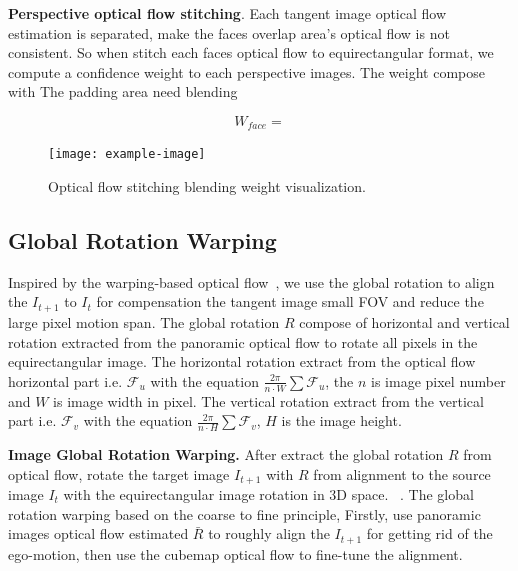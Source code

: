 \textbf{Perspective optical flow stitching}.
Each tangent image optical flow estimation is separated, make the faces overlap area's optical flow is not consistent.
So when stitch each faces optical flow to equirectangular format, we compute a confidence weight to each perspective images.
The weight compose with 
The padding area need blending

\begin{equation}
W_{face} =
\end{equation}

\begin{figure}[hbt!]
	\centering
	\texttt{[image: example-image]}
	\caption{Optical flow stitching blending weight visualization.}
	\label{fig:approach:blendweight}
\end{figure}

\subsection{Global Rotation Warping}
\label{sec:approach:warping}

Inspired by the warping-based optical flow~\cite{BroxBPW2004}, we use the global rotation to align the $I_{t+1}$ to $I_{t}$ for compensation the tangent image small FOV and reduce the large pixel motion span.
The global rotation $R$ compose of horizontal and vertical rotation extracted from the panoramic optical flow to rotate all pixels in the equirectangular image.
The horizontal rotation extract from the optical flow horizontal part i.e. $\mathcal{F}_u$ with the equation $\frac{2\pi}{n\cdot W}\sum\mathcal{F}_u$, the $n$ is image pixel number and $W$ is image width in pixel.
The vertical rotation extract from the vertical part i.e. $\mathcal{F}_v$ with the equation $\frac{2\pi}{n\cdot H}\sum\mathcal{F}_v$, $H$ is the image height.

\textbf{Image Global Rotation Warping.}
After extract the global rotation $R$ from optical flow, rotate the target image $I_{t+1}$ with $R$ from alignment to the source image $I_{t}$ with the equirectangular image rotation in 3D space. ~\cite{ZioulKZAD2019}.
%
The global rotation warping based on the coarse to fine principle, 
Firstly, use panoramic images optical flow estimated $\bar{R}$ to roughly align the $I_{t+1}$ for getting rid of the ego-motion, then use the cubemap optical flow to fine-tune the alignment.

